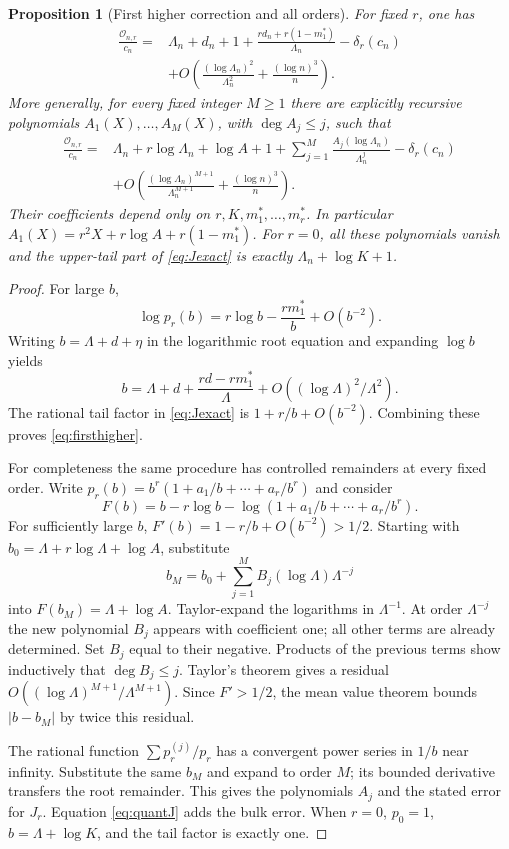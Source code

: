 \documentclass[11pt,oneside]{article}
\numberwithin{equation}{section}
\theoremstyle{plain}
\newtheorem{proposition}[theorem]{Proposition}
\theoremstyle{definition}
\theoremstyle{remark}
\newcommand{\OO}{\mathcal O}
\begin{document}
\begin{proposition}[First higher correction and all orders]
\label{prop:allorders}
For fixed $r$, one has
\begin{align}
 \frac{\OO_{n,r}}{c_n}
 ={}&\Lambda_n+d_n+1
 +\frac{r d_n+r(1-m_1^*)}{\Lambda_n}-\delta_r(c_n) \nonumber\\
 &+O\!\left(\frac{(\log\Lambda_n)^2}{\Lambda_n^2}
               +\frac{(\log n)^3}{n}\right).
 \label{eq:firsthigher}
\end{align}
More generally, for every fixed integer $M\ge1$ there are explicitly
recursive polynomials $A_1(X),\ldots,A_M(X)$, with
$\deg A_j\le j$, such that
\begin{align}
 \frac{\OO_{n,r}}{c_n}
 ={}&\Lambda_n+r\log\Lambda_n+\log A+1
       +\sum_{j=1}^M\frac{A_j(\log\Lambda_n)}{\Lambda_n^j}
       -\delta_r(c_n) \nonumber\\
 &+O\!\left(\frac{(\log\Lambda_n)^{M+1}}{\Lambda_n^{M+1}}
               +\frac{(\log n)^3}{n}\right).
 \label{eq:allorders}
\end{align}
Their coefficients depend only on $r,K,m_1^*,\ldots,m_r^*$.
In particular
$A_1(X)=r^2X+r\log A+r(1-m_1^*)$.
For $r=0$, all these polynomials vanish and the upper-tail part of
\eqref{eq:Jexact} is exactly $\Lambda_n+\log K+1$.
\end{proposition}
\begin{proof}
For large $b$,
\[
 \log p_r(b)=r\log b-\frac{r m_1^*}{b}+O(b^{-2}).
\]
Writing $b=\Lambda+d+\eta$ in the logarithmic root equation and
expanding $\log b$ yields
\[
 b=\Lambda+d+\frac{rd-rm_1^*}{\Lambda}
      +O((\log\Lambda)^2/\Lambda^2).
\]
The rational tail factor in \eqref{eq:Jexact} is
$1+r/b+O(b^{-2})$. Combining these proves \eqref{eq:firsthigher}.

For completeness the same procedure has controlled remainders at
every fixed order. Write
$p_r(b)=b^r(1+a_1/b+\cdots+a_r/b^r)$ and consider
\[
 F(b)=b-r\log b-\log(1+a_1/b+\cdots+a_r/b^r).
\]
For sufficiently large $b$, $F'(b)=1-r/b+O(b^{-2})>1/2$.
Starting with $b_0=\Lambda+r\log\Lambda+\log A$, substitute
\[
 b_M=b_0+\sum_{j=1}^M B_j(\log\Lambda)\Lambda^{-j}
\]
into $F(b_M)=\Lambda+\log A$. Taylor-expand the logarithms in
$\Lambda^{-1}$. At order $\Lambda^{-j}$ the new polynomial $B_j$
appears with coefficient one; all other terms are already determined.
Set $B_j$ equal to their negative. Products of the previous terms
show inductively that $\deg B_j\le j$. Taylor's theorem gives a
residual $O((\log\Lambda)^{M+1}/\Lambda^{M+1})$. Since $F'>1/2$,
the mean value theorem bounds $|b-b_M|$ by twice this residual.

The rational function $\sum p_r^{(j)}/p_r$ has a convergent power
series in $1/b$ near infinity. Substitute the same $b_M$ and expand
to order $M$; its bounded derivative transfers the root remainder.
This gives the polynomials $A_j$ and the stated error for $J_r$.
Equation \eqref{eq:quantJ} adds the bulk error. When $r=0$,
$p_0=1$, $b=\Lambda+\log K$, and the tail factor is exactly one.
\end{proof}
\end{document}
